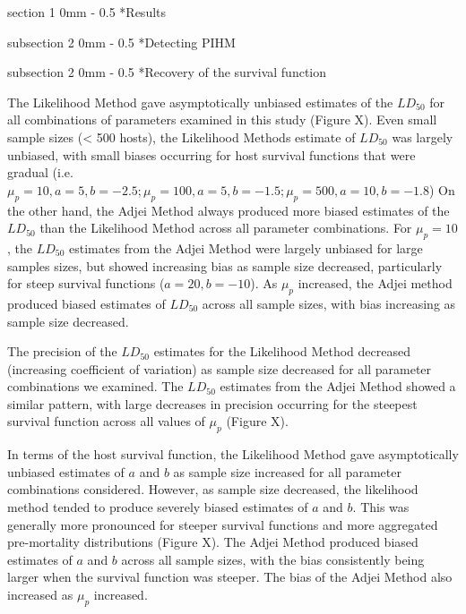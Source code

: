 \documentclass[12pt, a4paper]{article}
\makeatletter
\renewcommand{\section}{\@startsection
{section}%
{1}%
{0mm}%
{-\baselineskip}%
{0.5\baselineskip}%
{\normalfont\bf\large}} %
\renewcommand{\subsection}{\@startsection
{subsection}%
{2}%
{0mm}%
{-\baselineskip}%
{0.5\baselineskip}%
{\normalfont\bf}} %
\makeatother
\begin{document}
\section*{Results}

\subsection*{Detecting PIHM}



\subsection*{Recovery of the survival function}

The Likelihood Method gave asymptotically unbiased estimates of the $LD_{50}$ for all combinations of parameters examined in this study (Figure X).  Even small sample sizes (< 500 hosts), the Likelihood Methods estimate of $LD_{50}$ was largely unbiased, with small biases occurring for host survival functions that were gradual (i.e. $\mu_p = 10, a = 5, b = -2.5; \mu_p = 100, a = 5, b= -1.5; \mu_p = 500, a = 10, b = -1.8$)   On the other hand, the Adjei Method always produced more biased estimates of the $LD_{50}$ than the Likelihood Method across all parameter combinations.  For $\mu_p = 10$, the $LD_{50}$ estimates from the Adjei Method were largely unbiased for large samples sizes, but showed increasing bias as sample size decreased, particularly for steep survival functions ($a = 20, b = -10$).  As $\mu_p$ increased, the Adjei method produced biased estimates of $LD_{50}$ across all sample sizes, with bias increasing as sample size decreased.

The precision of the $LD_{50}$ estimates for the Likelihood Method decreased (increasing coefficient of variation) as sample size decreased for all parameter combinations we examined.  The $LD_{50}$ estimates from the Adjei Method showed a similar pattern, with large decreases in precision occurring for the steepest survival function across all values of $\mu_p$ (Figure X).

In terms of the host survival function, the Likelihood Method gave
asymptotically unbiased estimates of $a$ and $b$ as sample size increased for
all parameter combinations considered.  However, as sample size decreased, the
likelihood method tended to produce severely biased estimates of $a$ and $b$.
This was generally more pronounced for steeper survival functions and more
aggregated pre-mortality distributions (Figure X).  The Adjei Method produced
biased estimates of $a$ and $b$ across all sample sizes, with the bias
consistently being larger when the survival function was steeper. The bias of
the Adjei Method also increased as $\mu_p$ increased.
\end{document}
